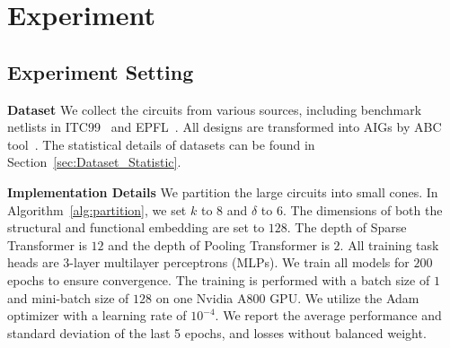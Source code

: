 \vspace{-10pt}
\section{Experiment}

\vspace{-5pt}
\subsection{Experiment Setting}
\label{sec:exp_setting}
\vspace{-5pt}
\noindent\textbf{Dataset}
We collect the circuits from various sources, including benchmark netlists in ITC99~\citep{ITC99} and EPFL~\citep{EPFLBenchmarks}. All designs are transformed into AIGs by ABC tool~\citep{brayton2010abc}. The statistical details of datasets can be found in Section~\ref{sec:Dataset_Statistic}.

\noindent\textbf{Implementation Details}
We partition the large circuits into small cones. In Algorithm~\ref{alg:partition}, we set $k$ to 8 and $\delta$ to 6.
The dimensions of both the structural and functional embedding are set to $128$. The depth of Sparse Transformer is $12$ and the depth of Pooling Transformer is $2$. All training task heads are 3-layer multilayer perceptrons (MLPs). 
We train all models for $200$ epochs to ensure convergence. The training is performed with a batch size of $1$ and mini-batch size of $128$ on one Nvidia A800 GPU. We utilize the Adam optimizer with a learning rate of $10^{-4}$. We report the average performance and standard deviation of the last 5 epochs, and losses without balanced weight.

\vspace{-5pt}
